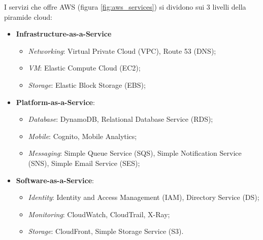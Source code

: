 \documentclass[../main.tex]{subfiles}
\begin{document}
    	    I servizi che offre AWS (figura \ref{fig:aws_services}) si dividono sui 3 livelli della piramide cloud:
    	    \begin{itemize}
    	        \item \textbf{Infrastructure-as-a-Service}
    	        \begin{itemize}
    	            \item \emph{Networking}: Virtual Private Cloud (VPC), Route 53 (DNS);
    	            \item \emph{VM}: Elastic Compute Cloud (EC2);
    	            \item \emph{Storage}: Elastic Block Storage (EBS);
    	        \end{itemize}
    	        \item \textbf{Platform-as-a-Service}:
    	        \begin{itemize}
    	            \item \emph{Database}: DynamoDB, Relational Database Service (RDS);
    	            \item \emph{Mobile}: Cognito, Mobile Analytics;
    	            \item \emph{Messaging}: Simple Queue Service (SQS), Simple Notification Service (SNS), Simple Email Service (SES);
    	        \end{itemize}
    	        \item \textbf{Software-as-a-Service}:
    	        \begin{itemize}
    	            \item \emph{Identity}: Identity and Access Management (IAM), Directory Service (DS);
    	            \item \emph{Monitoring}: CloudWatch, CloudTrail, X-Ray;
    	            \item \emph{Storage}: CloudFront, Simple Storage Service (S3).
    	        \end{itemize}
    	    \end{itemize}
    	    
\end{document}
